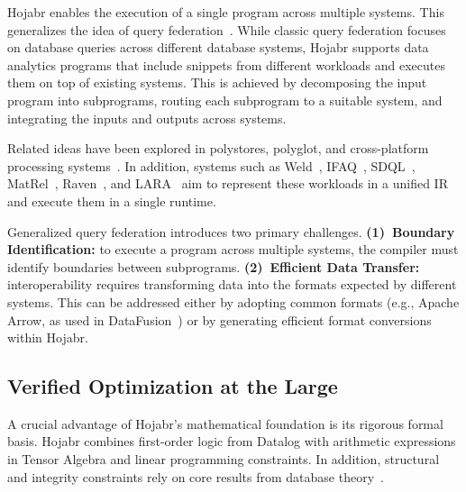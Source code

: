 \documentclass[sigconf,nonacm]{acmart}
\begin{document}
Hojabr enables the execution of a single program across multiple systems. This generalizes the idea of query federation~\cite{sheth1990federated}. While classic query federation focuses on database queries across different database systems, Hojabr supports data analytics programs that include snippets from different workloads and executes them on top of existing systems. This is achieved by decomposing the input program into subprograms, routing each subprogram to a suitable system, and integrating the inputs and outputs across systems.

Related ideas have been explored in polystores, polyglot, and cross-platform processing systems~\cite{duggan2015bigdawg,dewitt2013split,kaoudi2022unified,kiehn2022polyglot,polystore_query_lang}. In addition, systems such as Weld~\cite{palkar2017weld}, IFAQ~\cite{shaikhha2020multi,shaikhha2021intermediate}, SDQL~\cite{DBLP:journals/pacmpl/ShaikhhaHSO22,shahrokhi2023building}, MatRel~\cite{matrel}, Raven~\cite{raven}, and LARA~\cite{laradb} aim to represent these workloads in a unified IR and execute them in a single runtime.

Generalized query federation introduces two primary challenges. \textbf{(1)~Boundary Identification:} to execute a program across multiple systems, the compiler must identify boundaries between subprograms. \textbf{(2)~Efficient Data Transfer:} interoperability requires transforming data into the formats expected by different systems. This can be addressed either by adopting common formats (e.g., Apache Arrow, as used in DataFusion~\cite{lamb2024apache}) or by generating efficient format conversions within Hojabr.


\subsection{Verified Optimization at the Large}
\label{sec:lifting}

A crucial advantage of Hojabr's mathematical foundation is its rigorous formal basis. Hojabr combines first-order logic from Datalog with arithmetic expressions in Tensor Algebra and linear programming constraints. In addition, structural and integrity constraints rely on core results from database theory~\cite{abiteboul1995foundations}.
\end{document}
